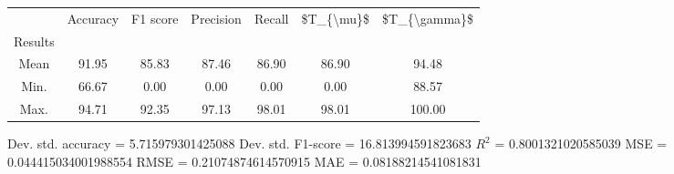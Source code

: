 \begin{tabular}{|c|c|c|c|c|c|c|}
\toprule
{} &  Accuracy &  F1 score &  Precision &  Recall &  \$T\_\{\textbackslash mu\}\$ &  \$T\_\{\textbackslash gamma\}\$ \\
Results &           &           &            &         &            &               \\
\hline
Mean    &     91.95 &     85.83 &      87.46 &   86.90 &      86.90 &         94.48 \\
Min.    &     66.67 &      0.00 &       0.00 &    0.00 &       0.00 &         88.57 \\
Max.    &     94.71 &     92.35 &      97.13 &   98.01 &      98.01 &        100.00 \\
\bottomrule
\end{tabular}

 Dev. std. accuracy = 5.715979301425088
 Dev. std. F1-score = 16.813994591823683
 $R^2$ = 0.8001321020585039
 MSE = 0.044415034001988554
 RMSE = 0.21074874614570915
 MAE = 0.08188214541081831